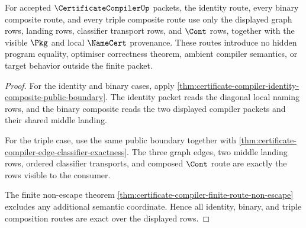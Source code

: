 \begin{theorem}
\label{thm:certificate-compiler-route-composition-exactness}
For accepted $\CertificateCompilerUp$ packets, the identity route, every
binary composite route, and every triple composite route use only the
displayed graph rows, landing rows, classifier transport rows, and $\Cont$
rows, together with the visible $\Pkg$ and local $\NameCert$ provenance. These
routes introduce no hidden program equality, optimiser correctness theorem,
ambient compiler semantics, or target behavior outside the finite packet.
\end{theorem}
\begin{proof}
For the identity and binary cases, apply
\autoref{thm:certificate-compiler-identity-composite-public-boundary}. The
identity packet reads the diagonal local naming rows, and the binary composite
reads the two displayed compiler packets and their shared middle landing.

For the triple case, use the same public boundary together with
\autoref{thm:certificate-compiler-edge-classifier-exactness}. The three graph
edges, two middle landing rows, ordered classifier transports, and composed
$\Cont$ route are exactly the rows visible to the consumer.

The finite non-escape theorem
\autoref{thm:certificate-compiler-finite-route-non-escape} excludes any
additional semantic coordinate. Hence all identity, binary, and triple
composition routes are exact over the displayed rows.
\end{proof}

